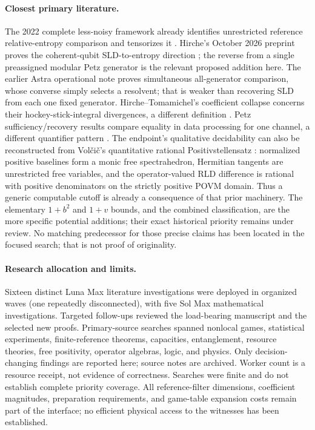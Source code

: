 \documentclass[11pt]{article}
\begin{document}
\paragraph{Closest primary literature.}
The 2022 complete less-noisy framework already identifies unrestricted
reference relative-entropy comparison and tensorizes it \cite{hrs}.
Hirche's October 2026 preprint proves the coherent-qubit SLD-to-entropy direction
\cite[Theorem 3.2, Proposition 3.5]{hirche}; the reverse from a single preassigned
modular Petz generator is the relevant proposed addition here. The earlier
Astra operational note proves simultaneous all-generator comparison, whose
converse simply selects a resolvent; that is weaker than recovering SLD from
each one fixed generator. Hirche--Tomamichel's coefficient collapse concerns
their hockey-stick-integral divergences, a different definition
\cite[Proposition 4.8]{ht}. Petz sufficiency/recovery results compare equality
in data processing for one channel, a different quantifier pattern
\cite{hiai}. The endpoint's qualitative decidability can also be reconstructed
from Vol\v ci\v c's quantitative rational Positivstellensatz
\cite[Theorem 5.2, Remark 5.3]{volcic}: normalized positive baselines form a
monic free spectrahedron, Hermitian tangents are unrestricted free variables,
and the operator-valued RLD difference is rational with positive denominators
on the strictly positive POVM domain. Thus a generic computable cutoff is
already a consequence of that prior machinery. The elementary $1+b^2$ and
$1+v$ bounds, and the combined classification, are the more specific potential
additions; their exact historical priority remains under review.
No matching predecessor for those precise claims has been located in the
focused search; that is not proof of originality.

\paragraph{Research allocation and limits.}
Sixteen distinct Luna Max literature investigations were deployed in organized
waves (one repeatedly disconnected), with five Sol Max mathematical
investigations. Targeted follow-ups reviewed the load-bearing manuscript and
the selected new proofs. Primary-source searches spanned nonlocal games,
statistical experiments, finite-reference theorems, capacities, entanglement,
resource theories, free positivity, operator algebras, logic, and physics.
Only decision-changing findings are reported here; source notes are archived.
Worker count is a resource receipt, not evidence of correctness. Searches were
finite and do not establish complete priority coverage. All reference-filter
dimensions, coefficient magnitudes, preparation requirements, and game-table
expansion costs remain part of the interface; no efficient physical access to
the witnesses has been established.
\end{document}
